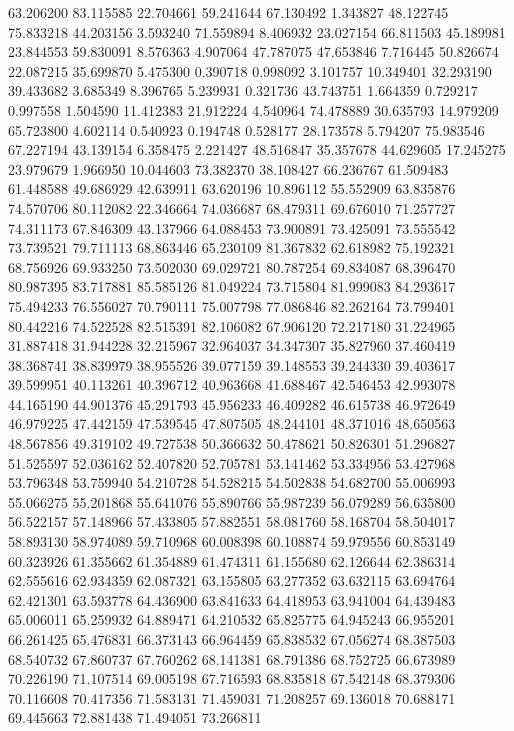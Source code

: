 63.206200
83.115585
22.704661
59.241644
67.130492
1.343827
48.122745
75.833218
44.203156
3.593240
71.559894
8.406932
23.027154
66.811503
45.189981
23.844553
59.830091
8.576363
4.907064
47.787075
47.653846
7.716445
50.826674
22.087215
35.699870
5.475300
0.390718
0.998092
3.101757
10.349401
32.293190
39.433682
3.685349
8.396765
5.239931
0.321736
43.743751
1.664359
0.729217
0.997558
1.504590
11.412383
21.912224
4.540964
74.478889
30.635793
14.979209
65.723800
4.602114
0.540923
0.194748
0.528177
28.173578
5.794207
75.983546
67.227194
43.139154
6.358475
2.221427
48.516847
35.357678
44.629605
17.245275
23.979679
1.966950
10.044603
73.382370
38.108427
66.236767
61.509483
61.448588
49.686929
42.639911
63.620196
10.896112
55.552909
63.835876
74.570706
80.112082
22.346664
74.036687
68.479311
69.676010
71.257727
74.311173
67.846309
43.137966
64.088453
73.900891
73.425091
73.555542
73.739521
79.711113
68.863446
65.230109
81.367832
62.618982
75.192321
68.756926
69.933250
73.502030
69.029721
80.787254
69.834087
68.396470
80.987395
83.717881
85.585126
81.049224
73.715804
81.999083
84.293617
75.494233
76.556027
70.790111
75.007798
77.086846
82.262164
73.799401
80.442216
74.522528
82.515391
82.106082
67.906120
72.217180
31.224965
31.887418
31.944228
32.215967
32.964037
34.347307
35.827960
37.460419
38.368741
38.839979
38.955526
39.077159
39.148553
39.244330
39.403617
39.599951
40.113261
40.396712
40.963668
41.688467
42.546453
42.993078
44.165190
44.901376
45.291793
45.956233
46.409282
46.615738
46.972649
46.979225
47.442159
47.539545
47.807505
48.244101
48.371016
48.650563
48.567856
49.319102
49.727538
50.366632
50.478621
50.826301
51.296827
51.525597
52.036162
52.407820
52.705781
53.141462
53.334956
53.427968
53.796348
53.759940
54.210728
54.528215
54.502838
54.682700
55.006993
55.066275
55.201868
55.641076
55.890766
55.987239
56.079289
56.635800
56.522157
57.148966
57.433805
57.882551
58.081760
58.168704
58.504017
58.893130
58.974089
59.710968
60.008398
60.108874
59.979556
60.853149
60.323926
61.355662
61.354889
61.474311
61.155680
62.126644
62.386314
62.555616
62.934359
62.087321
63.155805
63.277352
63.632115
63.694764
62.421301
63.593778
64.436900
63.841633
64.418953
63.941004
64.439483
65.006011
65.259932
64.889471
64.210532
65.825775
64.945243
66.955201
66.261425
65.476831
66.373143
66.964459
65.838532
67.056274
68.387503
68.540732
67.860737
67.760262
68.141381
68.791386
68.752725
66.673989
70.226190
71.107514
69.005198
67.716593
68.835818
67.542148
68.379306
70.116608
70.417356
71.583131
71.459031
71.208257
69.136018
70.688171
69.445663
72.881438
71.494051
73.266811
